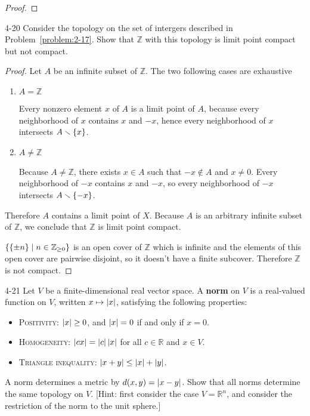 \begin{proof}
\end{proof}

\begin{problem}{4-20}
Consider the topology on the set of intergers described in Problem~\ref{problem:2-17}. Show that $\mathbb{Z}$ with this topology is limit point compact but not compact.
\end{problem}

\begin{proof}
	Let $A$ be an infinite subset of $\mathbb{Z}$. The two following cases are exhaustive
	\begin{enumerate}[label={\textbf{Case \arabic*.}},itemindent=1cm]
		\item $A = \mathbb{Z}$

		      Every nonzero element $x$ of $A$ is a limit point of $A$, because every neighborhood of $x$ contains $x$ and $-x$, hence every neighborhood of $x$ intersects $A\smallsetminus\left\{{x}\right\}$.
		\item $A \ne \mathbb{Z}$

		      Because $A \ne \mathbb{Z}$, there exists $x\in A$ such that $-x \notin A$ and $x\ne 0$. Every neighborhood of $-x$ contains $x$ and $-x$, so every neighborhood of $-x$ intersects $A\smallsetminus\left\{{-x}\right\}$.
	\end{enumerate}

	Therefore $A$ contains a limit point of $X$. Because $A$ is an arbitrary infinite subset of $\mathbb{Z}$, we conclude that $\mathbb{Z}$ is limit point compact.

	$\left\{{ \left\{{\pm n}\right\} \mid n\in\mathbb{Z}_{\geq 0} }\right\}$ is an open cover of $\mathbb{Z}$ which is infinite and the elements of this open cover are pairwise disjoint, so it doesn't have a finite subcover. Therefore $\mathbb{Z}$ is not compact.
\end{proof}

\begin{problem}{4-21}
Let $V$ be a finite-dimensional real vector space. A \textbf{norm} on $V$ is a real-valued function on $V$, written $x\mapsto \left\vert{x}\right\vert$, satisfying the following properties:
\begin{itemize}
	\item \textsc{Positivity}: $\left\vert{x}\right\vert \geq 0$, and $\left\vert{x}\right\vert = 0$ if and only if $x = 0$.
	\item \textsc{Homogeneity}: $\left\vert{cx}\right\vert = \left\vert{c}\right\vert\left\vert{x}\right\vert$ for all $c\in \mathbb{R}$ and $x\in V$.
	\item \textsc{Triangle inequality}: $\left\vert{x + y}\right\vert \leq \left\vert{x}\right\vert + \left\vert{y}\right\vert$.
\end{itemize}

A norm determines a metric by $d(x, y) = \left\vert{x - y}\right\vert$. Show that all norms determine the same topology on $V$. [Hint: first consider the case $V = \mathbb{R}^{n}$, and consider the restriction of the norm to the unit sphere.]
\end{problem}


